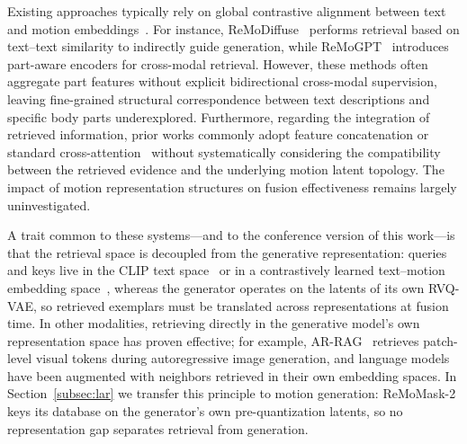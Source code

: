 \documentclass[10pt,journal,compsoc]{IEEEtran}
\begin{document}
Existing approaches typically rely on global contrastive alignment between text and motion embeddings~\cite{tmr,temos}. For instance, ReMoDiffuse~\cite{remodiffuse} performs retrieval based on text–text similarity to indirectly guide generation, while ReMoGPT~\cite{remogpt} introduces part-aware encoders for cross-modal retrieval. However, these methods often aggregate part features without explicit bidirectional cross-modal supervision, leaving fine-grained structural correspondence between text descriptions and specific body parts underexplored. Furthermore, regarding the integration of retrieved information, prior works commonly adopt feature concatenation or standard cross-attention~\cite{remodiffuse,remogpt} without systematically considering the compatibility between the retrieved evidence and the underlying motion latent topology. The impact of motion representation structures on fusion effectiveness remains largely uninvestigated.

A trait common to these systems---and to the conference version of this work---is that the retrieval space is decoupled from the generative representation: queries and keys live in the CLIP text space~\cite{clip,remodiffuse} or in a contrastively learned text--motion embedding space~\cite{tmr,remogpt}, whereas the generator operates on the latents of its own RVQ-VAE, so retrieved exemplars must be translated across representations at fusion time. In other modalities, retrieving directly in the generative model's own representation space has proven effective; for example, AR-RAG~\cite{qi2025ar} retrieves patch-level visual tokens during autoregressive image generation, and language models have been augmented with neighbors retrieved in their own embedding spaces.
In Section~\ref{subsec:lar} we transfer this principle to motion generation: ReMoMask-2 keys its database on the generator's own pre-quantization latents, so no representation gap separates retrieval from generation.

\end{document}
